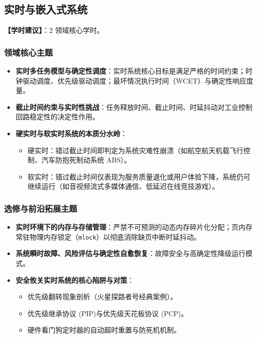 \subsection{实时与嵌入式系统}
\textbf{【学时建议】}：2 领域核心学时。

\subsubsection{领域核心主题}
\begin{itemize}\setlength{\itemsep}{0pt}\setlength{\parskip}{0pt}
    \item \textbf{实时多任务模型与确定性调度}：实时系统核心目标是满足严格的时间约束；时钟驱动调度、优先级驱动调度；最坏情况执行时间（WCET）与确定性响应度量。
    \item \textbf{截止时间约束与实时性挑战}：任务释放时间、截止时间、时延抖动对工业控制回路稳定性的决定性作用。
    \item \textbf{硬实时与软实时系统的本质分水岭}：
    \begin{itemize}\setlength{\itemsep}{0pt}\setlength{\parskip}{0pt}
        \item 硬实时：错过截止时间即判定为系统灾难性崩溃（如航空航天机载飞行控制、汽车防抱死制动系统 ABS）。
        \item 软实时：错过截止时间仅表现为服务质量退化或用户体验下降，系统仍可继续运行（如音视频流式多媒体通信、低延迟在线竞技游戏）。
    \end{itemize}
\end{itemize}

\subsubsection{选修与前沿拓展主题}
\begin{itemize}\setlength{\itemsep}{0pt}\setlength{\parskip}{0pt}
    \item \textbf{实时环境下的内存与存储管理}：严禁不可预测的动态内存碎片化分配；页内存常驻物理内存锁定（\texttt{mlock}）以彻底消除缺页中断时延抖动。
    \item \textbf{系统瞬时故障、风险评估与确定性自愈恢复}：故障安全与高确定性降级运行模式。
    \item \textbf{安全攸关实时系统的核心陷阱与对策}：
    \begin{itemize}\setlength{\itemsep}{0pt}\setlength{\parskip}{0pt}
        \item 优先级翻转现象剖析（火星探路者号经典案例）。
        \item 优先级继承协议 (PIP)与优先级天花板协议 (PCP)。
        \item 硬件看门狗定时器的自动超时重置与防死机机制。
    \end{itemize}
\end{itemize}

